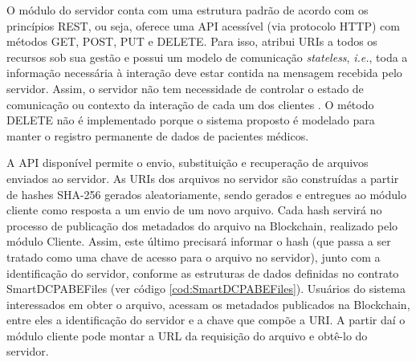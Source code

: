 \documentclass[a4paper,11pt]{article}
\begin{document}
O módulo do servidor conta com uma estrutura padrão de acordo com os princípios REST, ou seja, oferece uma API acessível (via protocolo HTTP) com métodos GET, POST, PUT e DELETE. Para isso, atribui URIs a todos os recursos sob sua gestão e possui um modelo de comunicação \emph{stateless}, \emph{i.e.}, toda a informação necessária à interação deve estar contida na mensagem recebida pelo servidor. Assim, o servidor não tem necessidade de controlar o estado de comunicação ou contexto da interação de cada um dos clientes \cite{Mark2013}.
O método DELETE não é implementado porque o sistema proposto é modelado para manter o registro permanente de dados de pacientes médicos. %


A API disponível permite o envio, substituição e recuperação de arquivos enviados ao servidor.
As URIs dos arquivos no servidor são construídas a partir de hashes SHA-256 gerados aleatoriamente, sendo gerados e entregues ao módulo cliente como resposta a um envio de um novo arquivo.
Cada hash servirá no processo de publicação dos metadados do arquivo na Blockchain, realizado pelo módulo Cliente. Assim, este último precisará informar o hash (que passa a ser tratado como uma chave de acesso para o arquivo no servidor), junto com a identificação do servidor, conforme as estruturas de dados definidas no contrato SmartDCPABEFiles (ver código \ref{cod:SmartDCPABEFiles}).
Usuários do sistema interessados em obter o arquivo, acessam os metadados publicados na Blockchain, entre eles a identificação do servidor e a chave que compõe a URI.
A partir daí o módulo cliente pode montar a URL da requisição do arquivo e obtê-lo do servidor.

\end{document}
